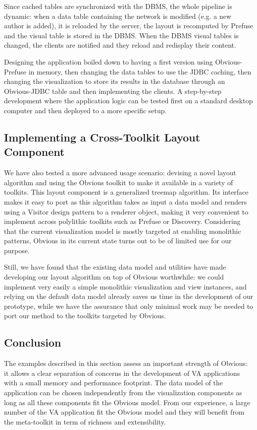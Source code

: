 Since cached tables are synchronized with the DBMS, the whole pipeline
is dynamic: when a data table containing the network is modified
(e.g. a new author is added), it is reloaded by the server, the layout
is recomputed by Prefuse and the visual table is stored in the DBMS.
When the DBMS visual tables is changed, the clients are notified and
they reload and redisplay their content.

Designing the application boiled down to having a first version using
Obvious-Prefuse in memory, then changing the data tables to use the
JDBC caching, then changing the visualization to store its results in
the database through an Obvious-JDBC table and then implementing the
clients.  A step-by-step development where the application logic can
be tested first on a standard desktop computer and then deployed to a
more specific setup.

\subsection{Implementing a Cross-Toolkit Layout Component}

We have also tested a more advanced usage scenario: devising
a novel layout algorithm and using the Obvious toolkit to make it
available in a variety of toolkits. This layout component is a
generalized treemap algorithm.
Its interface makes it easy to port as this
algorithm takes as input a data model and renders using a Visitor
design pattern to a renderer object, making it very convenient to
implement across polylithic toolkits such as Prefuse or Discovery.
Considering that the current visualization model is mostly targeted at
enabling monolithic patterns, Obvious in its current state turns out
to be of limited use for our purpose.

Still, we have found that the existing data model and utilities have
made developing our layout algorithm on top of Obvious worthwhile: we
could implement very easily a simple monolithic visualization and
view instances, and relying on the default data model already saves us
time in the development of our prototype, while we have the assurance
that only minimal work may be needed to port our method to the
toolkits targeted by Obvious.


\subsection{Conclusion}

The examples described in this section assess an important strength of
Obvious: it allows a clear separation of concerns in the development
of VA applications with a small memory and performance footprint.  The
data model of the application can be chosen independently from the
visualization components as long as all these components fit the
Obvious model.  From our experience, a large number of the VA
application fit the Obvious model and they will benefit from the
meta-toolkit in term of richness and extensibility.

